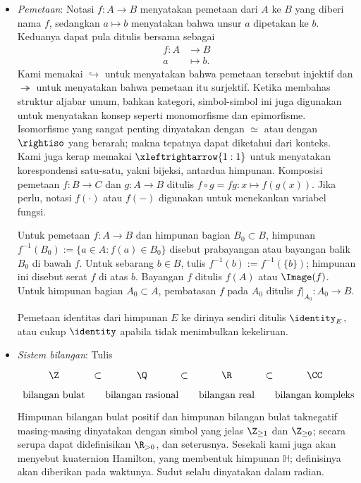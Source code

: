 \begin{itemize}
	\item \emph{Pemetaan}: Notasi $f: A \to B$ menyatakan pemetaan dari $A$ ke $B$ yang diberi nama $f$, sedangkan $a \mapsto b$ menyatakan bahwa unsur $a$ dipetakan ke $b$. Keduanya dapat pula ditulis bersama sebagai
	\begin{align*}
		f: A & \longrightarrow B \\
		a & \longmapsto b.
	\end{align*}
	Kami memakai $\hookrightarrow$ untuk menyatakan bahwa pemetaan tersebut injektif dan $\twoheadrightarrow$ untuk menyatakan bahwa pemetaan itu surjektif. Ketika membahas struktur aljabar umum, bahkan kategori, simbol-simbol ini juga digunakan untuk menyatakan konsep seperti monomorfisme dan epimorfisme. Isomorfisme yang sangat penting dinyatakan dengan $\simeq$ atau dengan $\rightiso$ yang berarah; makna tepatnya dapat diketahui dari konteks. Kami juga kerap memakai $\xleftrightarrow{1:1}$ untuk menyatakan korespondensi satu-satu, yakni bijeksi, antardua himpunan. Komposisi pemetaan $f: B \to C$ dan $g: A \to B$ ditulis $f \circ g = fg: x \mapsto f(g(x))$. Jika perlu, notasi $f(\cdot)$ atau $f(-)$ digunakan untuk menekankan variabel fungsi.
	
	Untuk pemetaan $f: A \to B$ dan himpunan bagian $B_0 \subset B$, himpunan $f^{-1}(B_0) := \{a \in A: f(a) \in B_0 \}$ disebut prabayangan atau bayangan balik $B_0$ di bawah $f$. Untuk sebarang $b \in B$, tulis $f^{-1}(b) := f^{-1}\left(\{b\} \right)$; himpunan ini disebut serat $f$ di atas $b$. Bayangan $f$ ditulis $f(A)$ atau $\Image(f)$. Untuk himpunan bagian $A_0 \subset A$, pembatasan $f$ pada $A_0$ ditulis $f|_{A_0}: A_0 \to B$.
	
	Pemetaan identitas dari himpunan $E$ ke dirinya sendiri ditulis $\identity_E$, atau cukup $\identity$ apabila tidak menimbulkan kekeliruan.

	\item \emph{Sistem bilangan}: Tulis
		\[\begin{tikzcd}[row sep=tiny, column sep=small]
			\Z \arrow[phantom, r, "\subset" description] & \Q \arrow[phantom, r, "\subset" description] & \R \arrow[phantom, r, "\subset" description] & \CC \\
			\text{bilangan bulat} & \text{bilangan rasional} & \text{bilangan real} & \text{bilangan kompleks}
		\end{tikzcd}\]
		Himpunan bilangan bulat positif dan himpunan bilangan bulat taknegatif masing-masing dinyatakan dengan simbol yang jelas $\Z_{\geq 1}$ dan $\Z_{\geq 0}$; secara serupa dapat didefinisikan $\R_{>0}$, dan seterusnya. Sesekali kami juga akan menyebut kuaternion Hamilton, yang membentuk himpunan $\mathbb{H}$; definisinya akan diberikan pada waktunya. Sudut selalu dinyatakan dalam radian.
		

\end{itemize}
